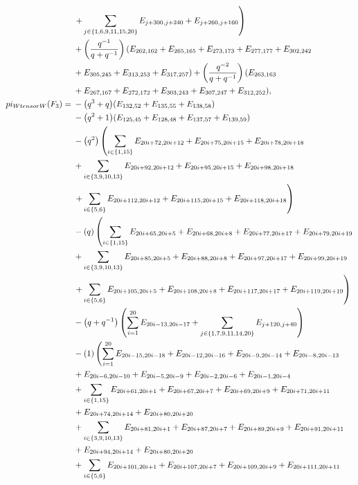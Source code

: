 \documentclass[10pt,a4paper]{amsart}
\numberwithin{equation}{section}
\theoremstyle{definition}
\def\pi{pi}
\def\otimes{ tensor }
\begin{document}
\begin{align*}
&\left. + \sum_{j \in \{1,6,9,11,15,20\}} E_{j+300,j+240} + E_{j+260,j+160} \right) \\
&+\left(\frac{q^{-1}}{q + q^{-1}}\right)(E_{262,162}+E_{265,165}+E_{273,173}+E_{277,177}+E_{302,242}\\
&+E_{305,245}+E_{313,253}+E_{317,257})+\left(\frac{q^{-2}}{q + q^{-1}}\right)(E_{263,163}\\
&+E_{267,167}+E_{272,172}+E_{303,243}+E_{307,247}+E_{312,252}),
\\
 \pi_{W \otimes W}(F_3) ={}&
-\bigl(q^3 + q\bigr)(E_{132,52}+E_{135,55}+E_{138,58})\\
&-\bigl(q^2 + 1\bigr)(E_{125,45}+E_{128,48}+E_{137,57}+E_{139,59})\\
&-\bigl(q^2\bigr)\left( \sum_{i \in \{1,15\}} E_{20i+72,20i+12} + E_{20i+75,20i+15} + E_{20i+78,20i+18} \right.\\
&+ \sum_{i \in \{3,9,10,13\}} E_{20i+92,20i+12} + E_{20i+95,20i+15} + E_{20i+98,20i+18} \\
&\left.+ \sum_{i \in \{5,6\}} E_{20i+112,20i+12} + E_{20i+115,20i+15} + E_{20i+118,20i+18} \right)\\
&-(q)\left( \sum_{i \in \{1,15\}} E_{20i+65,20i+5} + E_{20i+68,20i+8} + E_{20i+77,20i+17} + E_{20i+79,20i+19} \right.\\
&+ \sum_{i \in \{3,9,10,13\}} E_{20i+85,20i+5} + E_{20i+88,20i+8} + E_{20i+97,20i+17} + E_{20i+99,20i+19} \\
&\left. + \sum_{i \in \{5,6\}} E_{20i+105,20i+5} + E_{20i+108,20i+8} + E_{20i+117,20i+17} + E_{20i+119,20i+19} \right)\\
&-\bigl(q+q^{-1}\bigr)\left( \sum_{i=1}^{20} E_{20i-13,20i-17} \vphantom{\sum_{j \in \{1,7,9,11,14,20\}}} + \sum_{j \in \{1,7,9,11,14,20\}} E_{j+120,j+40} \right)\\
&-(1)\left( \sum_{i=1}^{20} E_{20i-15,20i-18} + E_{20i-12,20i-16} + E_{20i-9,20i-14} + E_{20i-8,20i-13} \right.\\
&+ E_{20i-6,20i-10} + E_{20i-5,20i-9} + E_{20i-2,20i-6} + E_{20i-1,20i-4} \\
&+ \sum_{i \in \{1,15\}} E_{20i+61,20i+1} + E_{20i+67,20i+7} + E_{20i+69,20i+9} + E_{20i+71,20i+11} \\
&+ E_{20i+74,20i+14}+ E_{20i+80,20i+20} \\
&+ \sum_{i \in \{3,9,10,13\}} E_{20i+81,20i+1} + E_{20i+87,20i+7} + E_{20i+89,20i+9} + E_{20i+91,20i+11} \\
& + E_{20i+94,20i+14}+ E_{20i+80,20i+20} \\
&+ \sum_{i \in \{5,6\}} E_{20i+101,20i+1} + E_{20i+107,20i+7} + E_{20i+109,20i+9} + E_{20i+111,20i+11} \\

\end{align*}
\end{document}
